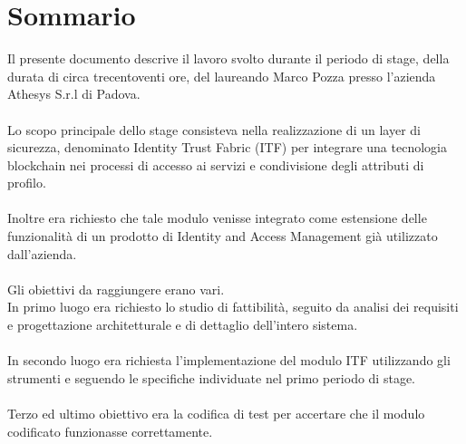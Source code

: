 
\cleardoublepage
{}
{}
\begingroup
\let\clearpage\relax
\let\cleardoublepage\relax
\let\cleardoublepage\relax

\chapter*{Sommario}

Il presente documento descrive il lavoro svolto durante il periodo di stage, della durata di circa trecentoventi ore, del laureando Marco Pozza presso l'azienda Athesys S.r.l di Padova.\\\\
Lo scopo principale dello stage consisteva nella realizzazione di un layer di sicurezza, denominato Identity Trust Fabric (ITF) per integrare una tecnologia blockchain nei processi di accesso ai servizi e condivisione degli attributi di profilo.\\\\
Inoltre era richiesto che tale modulo venisse integrato come estensione delle funzionalità di un prodotto di Identity and Access Management già utilizzato dall'azienda.\\\\
Gli obiettivi da raggiungere erano vari.\\
In primo luogo era richiesto lo studio di fattibilità, seguito da analisi dei requisiti e progettazione architetturale e di dettaglio dell'intero sistema.\\\\
In secondo luogo era richiesta l'implementazione del modulo ITF utilizzando gli strumenti e seguendo le specifiche individuate nel primo periodo di stage.\\\\
Terzo ed ultimo obiettivo era la codifica di test per accertare che il modulo codificato funzionasse correttamente.

%
%

\endgroup			

\vfill

